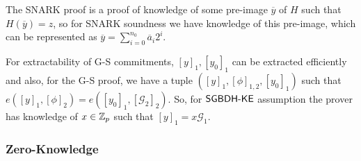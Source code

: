 The SNARK proof is a proof of knowledge of some pre-image $\overline{y}$ of $H$ such that $H(\overline{y})=z$, so for SNARK soundness we have knowledge of this pre-image, which can be represented as $\overline{y} = \sum_{i=0}^{n_0} \overline{a}_i 2^i$.

For extractability of G-S commitments, $[y]_1,[y_0]_1$ can be extracted efficiently and also, for the G-S proof, we have a tuple $([y]_1,[\phi]_{1,2},[y_0]_1)$ such that $e([y]_1, [\phi]_2) =e([y_0]_1,[\mathcal{G}_2]_2)$. So, for $\mathsf{SGBDH\mbox{-}KE}$ assumption the prover has knowledge of $x \in \mathbb{Z}_p$ such that $[y]_1 = x \mathcal{G}_1$.

%
%

\subsubsection*{Zero-Knowledge}

